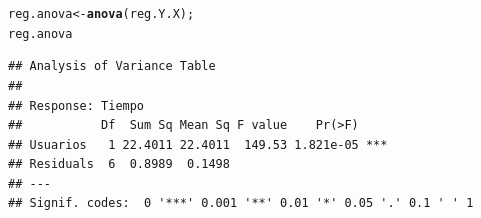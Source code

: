 \documentclass[12pt,letterpaper]{article}\usepackage[]{graphicx}\usepackage[]{color}
\makeatletter
\newcommand{\hlstd}[1]{\textcolor[rgb]{0.345,0.345,0.345}{#1}}%
\newcommand{\hlkwb}[1]{\textcolor[rgb]{0.69,0.353,0.396}{#1}}%
\newcommand{\hlkwd}[1]{\textcolor[rgb]{0.737,0.353,0.396}{\textbf{#1}}}%
\newenvironment{kframe}{%
 \def\at@end@of@kframe{}%
 \ifinner\ifhmode%
  \def\at@end@of@kframe{\end{minipage}}%
  \begin{minipage}{\columnwidth}%
 \fi\fi%
 \def\FrameCommand##1{\hskip\@totalleftmargin \hskip-\fboxsep
 \colorbox{shadecolor}{##1}\hskip-\fboxsep
     \hskip-\linewidth \hskip-\@totalleftmargin \hskip\columnwidth}%
 \MakeFramed {\advance\hsize-\width
   \@totalleftmargin\z@ \linewidth\hsize
   \@setminipage}}%
 {\par\unskip\endMakeFramed%
 \at@end@of@kframe}
\newenvironment{knitrout}{}{} %
\makeatother
\begin{document}
\begin{enumerate}
\begin{knitrout}
\color{fgcolor}\begin{kframe}
\begin{alltt}
\hlstd{reg.anova} \hlkwb{<-} \hlkwd{anova}\hlstd{(reg.Y.X);}
\hlstd{reg.anova}
\end{alltt}
\begin{verbatim}
## Analysis of Variance Table
## 
## Response: Tiempo
##           Df  Sum Sq Mean Sq F value    Pr(>F)    
## Usuarios   1 22.4011 22.4011  149.53 1.821e-05 ***
## Residuals  6  0.8989  0.1498                      
## ---
## Signif. codes:  0 '***' 0.001 '**' 0.01 '*' 0.05 '.' 0.1 ' ' 1
\end{verbatim}
\end{kframe}
\end{knitrout}
\end{enumerate}
\end{document}

